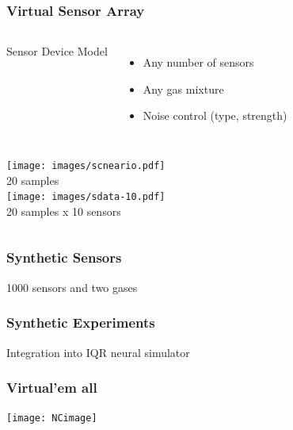 \documentclass{beamer}
\begin{document}
\begin{frame}
  \frametitle{Virtual Sensor Array}
   \begin{columns}
    Sensor Device Model
      \begin{itemize}
        \item Any number of sensors
        \item Any gas mixture
        \item Noise control (type, strength)
      \end{itemize}    
  \end{columns}  
  
  \begin{columns}
    \texttt{[image: images/scneario.pdf]} \\
    {\tiny 20 samples} \\
    \texttt{[image: images/sdata-10.pdf]} \\
    {\tiny 20 samples x 10 sensors} \\
  \end{columns}  
\end{frame}

\begin{frame}
\frametitle{Synthetic Sensors}
1000 sensors and two gases
\begin{center}
 \end{center}
\end{frame}

\begin{frame}
\frametitle{Synthetic Experiments}
Integration into IQR neural simulator
\begin{center}
 \end{center}
\end{frame}

\begin{frame}
  \frametitle{Virtual'em all}
 
  \begin{center}
    \texttt{[image: NCimage]}
  \end{center}
 \end{frame}
\end{document}

